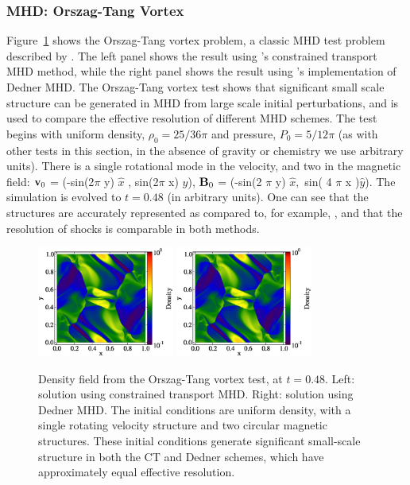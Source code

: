 \subsubsection{MHD: Orszag-Tang Vortex}
\label{sec.tests.mhd}
Figure~\ref{fig.orszag} shows the Orszag-Tang vortex problem, a
classic MHD test problem described by \citep{Orszag79}.  The left panel shows
the result using \enzo's constrained transport MHD method, while the right panel shows the result using
\enzo's implementation of Dedner MHD.
The Orszag-Tang vortex test shows that significant small scale structure can be generated in MHD
from large scale initial perturbations, and is used to compare the
effective resolution of different MHD schemes.  The test begins with uniform
density, $\rho_0=25/36 \pi$ and pressure, $P_0=5/12 \pi$ (as with
other tests in this section, in the absence of gravity or chemistry we use
arbitrary units).  There is a
single rotational mode in the velocity, and two in the magnetic field:
${\bf v}_0 $ = (-sin(2$\pi$ y) $ \hat{x}$ , sin(2$\pi$ x) $\hat{y}$),
${\bf B}_0$ = (-sin(2 $\pi$ y) $ \hat{x},$ sin( 4 $\pi$ x )$\hat{y}$).
The simulation is evolved to $t=0.48$ (in arbitrary units).  One can see that the structures
are accurately represented as compared to, for example,
\citet{Toth00}, and that the resolution of shocks is comparable in
both methods.

\begin{figure}
\begin{center}
\includegraphics[width=0.4\textwidth]{figures/MHDCT_OrszagTang_Density.eps}
\includegraphics[width=0.4\textwidth]{figures/MHDDedner_OrszagTang_Density.eps}
\caption{Density field from the Orszag-Tang vortex test, at $t=0.48$.
Left: solution using constrained transport MHD.  Right: solution using
Dedner MHD. The initial conditions are uniform density, with a single
rotating velocity structure and two circular magnetic structures.
These initial conditions generate significant small-scale structure in
both the CT and Dedner schemes, which have approximately equal
effective resolution.}
\label{fig.orszag}
\end{center}
\end{figure}
